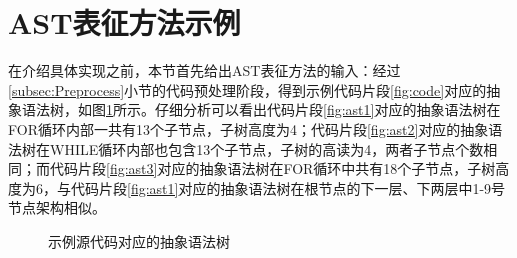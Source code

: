 \section{AST表征方法示例}
\label{sec:ASTachieve}
在介绍具体实现之前，本节首先给出AST表征方法的输入：经过\ref{subsec:Preprocess}小节的代码预处理阶段，得到示例代码片段\ref{fig:code}对应的抽象语法树，如图\ref{fig:astcode}所示。仔细分析可以看出代码片段\ref{fig:ast1}对应的抽象语法树在FOR循环内部一共有13个子节点，子树高度为4；代码片段\ref{fig:ast2}对应的抽象语法树在WHILE循环内部也包含13个子节点，子树的高读为4，两者子节点个数相同；而代码片段\ref{fig:ast3}对应的抽象语法树在FOR循环中共有18个子节点，子树高度为6，与代码片段\ref{fig:ast1}对应的抽象语法树在根节点的下一层、下两层中1-9号节点架构相似。
\begin{figure}[htbp]
  \centering  %
  \caption{示例源代码对应的抽象语法树}    %
  \label{fig:astcode}    %
\end{figure}

